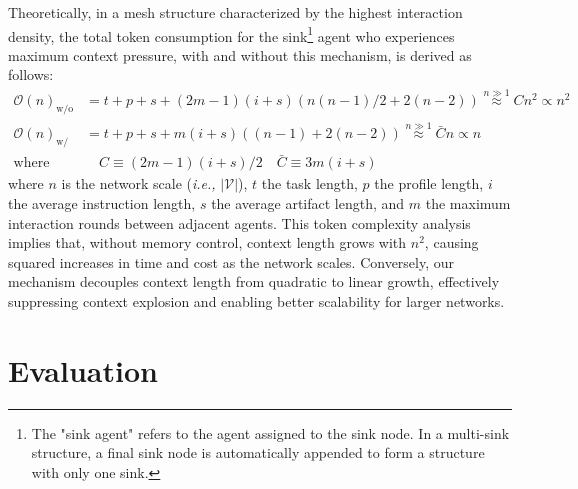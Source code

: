 \documentclass{article}
\newcommand{\ie}{\textit{i.e., }}
\begin{document}
Theoretically, in a mesh structure characterized by the highest interaction density, the total token consumption for the sink\footnote{The "sink agent" refers to the agent assigned to the sink node. In a multi-sink structure, a final sink node is automatically appended to form a structure with only one sink.} agent who experiences maximum context pressure, with and without this mechanism, is derived as follows:
\begin{equation}
\begin{aligned}
\mathcal{O}(n)_{\text{w/o}} &= t + p + s  + (2m-1)(i+s) ( n(n-1)/2 + 2(n-2) ) \overset{n \gg 1}{\approx} Cn^2 \propto n^2 \\
\mathcal{O}(n)_{\text{w/}} &= t + p + s + m(i+s) ( (n-1) + 2(n-2) ) \overset{n \gg 1}{\approx} \bar{C}n \propto n \\
\text{where} & \quad  C \equiv (2m-1)(i+s)/2 \quad \bar{C} \equiv 3m(i+s)
\end{aligned}
\end{equation}
where \( n \) is the network scale (\ie $|\mathcal{V}|$), \( t \) the task length,  \( p \) the profile length, \( i \) the average instruction length, \( s \) the average artifact length, and \( m \) the maximum interaction rounds between adjacent agents.
This token complexity analysis implies that, without memory control, context length grows with \( n^2 \), causing squared increases in time and cost as the network scales.
Conversely, our mechanism decouples context length from quadratic to linear growth, effectively suppressing context explosion and enabling better scalability for larger networks.


\section{Evaluation}
\end{document}
